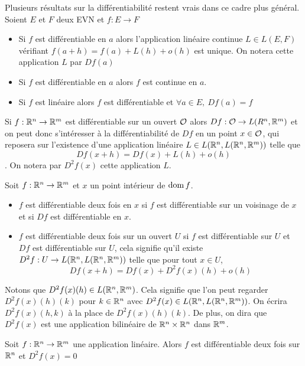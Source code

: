 \begin{theoreme}
    Plusieurs résultats sur la différentiabilité restent vrais dans ce cadre plus général.
    Soient $E$ et $F$ deux EVN et $f:E\to F$
    \begin{itemize}
        \item Si $f$ est différentiable en $a$ alors l'application linéaire continue $L\in L(E,F)$ vérifiant $f(a+h) = f(a) + L(h) + o(h)$ est unique. On notera cette application $L$ par $Df(a)$
        \item Si $f$ est différentiable en $a$ alors $f$ est continue en $a$.
        \item Si $f$ est linéaire alors $f$ est différentiable et $\forall a\in E,\ Df(a) = f$
    \end{itemize}
\end{theoreme}
Si $f:\mathbb{R}^n\to \mathbb{R}^m$ est différentiable sur un ouvert $\mathcal{O}$ alors $Df : \mathcal{O}\to L(R^n,\mathbb{R}^m)$ et on peut donc s'intéresser à la différentiabilité de $Df$ en un point $x\in\mathcal{O}$, qui reposera sur l'existence d'une application linéaire $L\in L(\mathbb{R}^n,L(\mathbb{R}^n,\mathbb{R}^m))$ telle que $$Df(x+h) = Df(x) + L(h) + o (h)$$. On notera par $D^2f(x)$ cette application $L$.
\begin{definition}
    Soit $f:\mathbb{R}^n\to \mathbb{R}^m$ et $x$ un point intérieur de $\operatorname{dom} f$. \begin{itemize}
        \item $f$ est différentiable deux fois en $x$ si $f$ est différentiable sur un voisinage de $x$ et si $Df$ est différentiable en $x$.
        \item $f$ est différentiable deux fois sur un ouvert $U$ si $f$ est différentiable sur $U$ et $Df$ est différentiable sur $U$, cela signifie qu'il existe $D^2f : U\to L(\mathbb{R}^n,L(\mathbb{R}^n,\mathbb{R}^m))$ 
        telle que pour tout $x\in U$,
        $$Df(x+h)=Df(x)+D^2f(x)(h)+ o(h)$$
    \end{itemize}
\end{definition}
\begin{remarque}
    Notons que $D^2f(x)(h)\in L(\mathbb{R}^n,\mathbb{R}^m)$. Cela signifie que l'on peut regarder $D^2f(x)(h)(k)$ pour $k\in \mathbb{R}^n$ avec $D^2f(x)\in L(\mathbb{R}^n,L(\mathbb{R}^n,\mathbb{R}^m))$.
     On écrira $D^2f(x)(h,k)$ à la place de $D^2f(x)(h)(k)$.
     De plus, on dira que $D^2f(x)$ est une application bilinéaire de $\mathbb{R}^n\times \mathbb{R}^n$ dans $\mathbb{R}^m$.
\end{remarque}
\begin{proposition}
    Soit $f : \mathbb{R}^n\to\mathbb{R}^m$ une application linéaire. Alors $f$ est différentiable deux fois sur $\mathbb{R}^n$ et $D^2f(x) = 0 $
\end{proposition}
